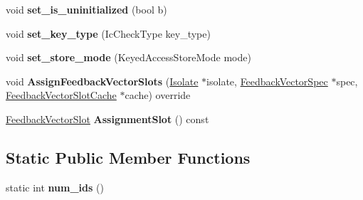 \begin{DoxyCompactItemize}
\item 
void {\bfseries set\+\_\+is\+\_\+uninitialized} (bool b)\hypertarget{classv8_1_1internal_1_1_assignment_af170ba7407a41f25cc93947e6dba890c}{}\label{classv8_1_1internal_1_1_assignment_af170ba7407a41f25cc93947e6dba890c}

\item 
void {\bfseries set\+\_\+key\+\_\+type} (Ic\+Check\+Type key\+\_\+type)\hypertarget{classv8_1_1internal_1_1_assignment_a430eca50341b1fa4aeccedcfb6cba377}{}\label{classv8_1_1internal_1_1_assignment_a430eca50341b1fa4aeccedcfb6cba377}

\item 
void {\bfseries set\+\_\+store\+\_\+mode} (Keyed\+Access\+Store\+Mode mode)\hypertarget{classv8_1_1internal_1_1_assignment_a5ae7fa0ac1bf5445e6e11b888041a2a2}{}\label{classv8_1_1internal_1_1_assignment_a5ae7fa0ac1bf5445e6e11b888041a2a2}

\item 
void {\bfseries Assign\+Feedback\+Vector\+Slots} (\hyperlink{classv8_1_1internal_1_1_isolate}{Isolate} $\ast$isolate, \hyperlink{classv8_1_1internal_1_1_feedback_vector_spec}{Feedback\+Vector\+Spec} $\ast$spec, \hyperlink{classv8_1_1internal_1_1_feedback_vector_slot_cache}{Feedback\+Vector\+Slot\+Cache} $\ast$cache) override\hypertarget{classv8_1_1internal_1_1_assignment_a690703c3157847789400e35a3df765b2}{}\label{classv8_1_1internal_1_1_assignment_a690703c3157847789400e35a3df765b2}

\item 
\hyperlink{classv8_1_1internal_1_1_feedback_vector_slot}{Feedback\+Vector\+Slot} {\bfseries Assignment\+Slot} () const \hypertarget{classv8_1_1internal_1_1_assignment_a70dabcf6420a2adadd8de7266eb722ad}{}\label{classv8_1_1internal_1_1_assignment_a70dabcf6420a2adadd8de7266eb722ad}

\end{DoxyCompactItemize}
\subsection*{Static Public Member Functions}
\begin{DoxyCompactItemize}
\item 
static int {\bfseries num\+\_\+ids} ()\hypertarget{classv8_1_1internal_1_1_assignment_a5c0190623f12de36119a1f45ff457286}{}\label{classv8_1_1internal_1_1_assignment_a5c0190623f12de36119a1f45ff457286}

\end{DoxyCompactItemize}
